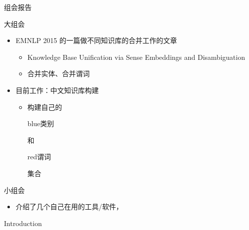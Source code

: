 \documentclass[color=usenames,dvipsnames]{beamer}
\begin{document}
\begin{frame}{组会报告}
 \begin{block}{大组会}
  \begin{itemize}
   \item EMNLP 2015 的一篇做不同知识库的合并工作的文章
    \begin{itemize}
     \item Knowledge Base Unification via Sense Embeddings and Disambiguation
     \item 合并实体、合并谓词
    \end{itemize}
   \item 目前工作：中文知识库构建
    \begin{itemize}
     \item 构建自己的\begin{color}{blue}类别\end{color}和\begin{color}{red}谓词\end{color}集合
    \end{itemize}
  \end{itemize}
 \end{block}

 \begin{block}{小组会}
  \begin{itemize}
   \item 介绍了几个自己在用的工具/软件，
  \end{itemize}

 \end{block}

\end{frame}


\begin{frame}{Introduction}

\end{frame}
\end{document}

